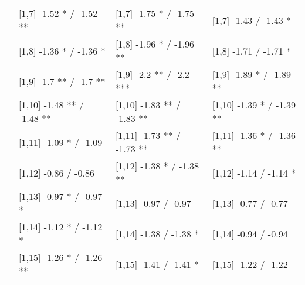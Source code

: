\begin{table}
\begin{tabular}[t]{llll}
 & {}[1,7] -1.52 * / -1.52 ** & {}[1,7] -1.75 * / -1.75 ** & {}[1,7] -1.43  / -1.43 *\\
\addlinespace
500 & {}[1,8] -1.36 * / -1.36 * & {}[1,8] -1.96 * / -1.96 ** & {}[1,8] -1.71  / -1.71 *\\
 & {}[1,9] -1.7 ** / -1.7 ** & {}[1,9] -2.2 ** / -2.2 *** & {}[1,9] -1.89 * / -1.89 **\\
 & {}[1,10] -1.48 ** / -1.48 ** & {}[1,10] -1.83 ** / -1.83 ** & {}[1,10] -1.39 * / -1.39 **\\
 & {}[1,11] -1.09 * / -1.09 & {}[1,11] -1.73 ** / -1.73 ** & {}[1,11] -1.36 * / -1.36 **\\
 & {}[1,12] -0.86  / -0.86 & {}[1,12] -1.38 * / -1.38 ** & {}[1,12] -1.14  / -1.14 *\\
\addlinespace
 & {}[1,13] -0.97 * / -0.97 * & {}[1,13] -0.97  / -0.97 & {}[1,13] -0.77  / -0.77\\
 & {}[1,14] -1.12 * / -1.12 * & {}[1,14] -1.38  / -1.38 * & {}[1,14] -0.94  / -0.94\\
 & {}[1,15] -1.26 * / -1.26 ** & {}[1,15] -1.41  / -1.41 * & {}[1,15] -1.22  / -1.22\\
\bottomrule
\end{tabular}
\end{table}

